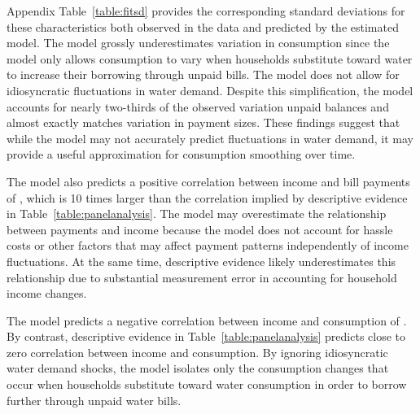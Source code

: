 \documentclass[12pt,table]{article}
\begin{document}
Appendix Table~\ref{table:fitsd} provides the corresponding standard deviations for these characteristics both observed in the data and predicted by the estimated model.  The model grossly underestimates variation in consumption since the model only allows consumption to vary when households substitute toward water to increase their borrowing through unpaid bills.  The model does not allow for idiosyncratic fluctuations in water demand.  Despite this simplification, the model accounts for nearly two-thirds of the observed variation unpaid balances and almost exactly matches variation in payment sizes.  These findings suggest that while the model may not accurately predict fluctuations in water demand, it may provide a useful approximation for consumption smoothing over time.


The model also predicts a positive correlation between income and bill payments of \unskip, which is 10 times larger than the correlation implied by descriptive evidence in Table~\ref{table:panelanalysis}.  The model may overestimate the relationship between payments and income because the model does not account for hassle costs or other factors that may affect payment patterns independently of income fluctuations.  At the same time, descriptive evidence likely underestimates this relationship due to substantial measurement error in accounting for household income changes.  

The model predicts a negative correlation between income and consumption of \unskip.  By contrast, descriptive evidence in Table~\ref{table:panelanalysis} predicts close to zero correlation between income and consumption.   By ignoring idiosyncratic water demand shocks, the model isolates only the consumption changes that occur when households substitute toward water consumption in order to borrow further through unpaid water bills. 


\end{document}
